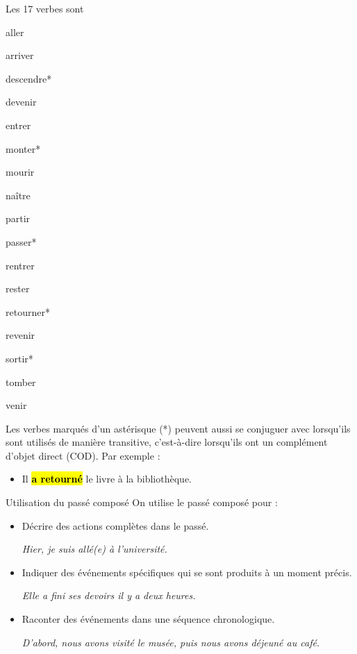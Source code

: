 Les 17 verbes sont
\begin{enumerate*}[label=(\arabic*)]
    \item aller \item arriver \item descendre* \item devenir \item entrer \item monter* \item mourir \item naître \item partir
    \item passer* \item rentrer \item rester \item retourner* \item revenir \item sortir* \item tomber \item venir
\end{enumerate*}

\begin{frwarn}
    Les verbes marqués d'un astérisque (*) peuvent aussi se conjuguer avec 
    lorsqu'ils sont utilisés de manière transitive, c'est-à-dire lorsqu'ils ont un complément
    d'objet direct (COD). Par exemple :
    \begin{itemize}
        \item Il \hl{\textbf{a retourné}} le livre à la bibliothèque.
    \end{itemize}
\end{frwarn}

\begin{frbox}[violet]{Utilisation du passé composé}
    On utilise le passé composé pour :
    \begin{itemize}
        \item Décrire des actions complètes dans le passé.
        
        \qquad\textit{Hier, je suis allé(e) à l'université.}
        \item Indiquer des événements spécifiques qui se sont produits à un moment précis.
        
        \qquad\textit{Elle a fini ses devoirs il y a deux heures.}
        \item Raconter des événements dans une séquence chronologique.
        
        \qquad\textit{D'abord, nous avons visité le musée, puis nous avons déjeuné au café.}
    \end{itemize}
\end{frbox}

